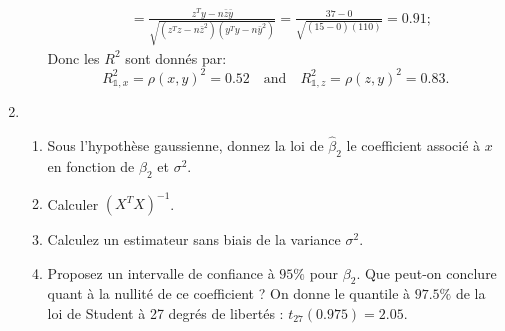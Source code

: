 \documentclass{../headers/td_upc}
\providecommand{\1}{\mathds{1}}
\begin{document}
\begin{enumerate}
\begin{enumerate}
{\begin{align*}
        & = \frac{z^Ty - n\bar{z}\bar{y}}{\sqrt{(z^Tz - n\bar{z}^2)(y^Ty - n\bar{y}^2)}}
        = \frac{37 - 0}{\sqrt{(15 - 0)(110)}} 
        = 0.91 ;
    \end{align*}
    Donc les $R^2$ sont donnés par:
    \[
    R^2_{\1,x} = \rho(x, y)^2 = 0.52
    \quad \text{and}\quad
    R^2_{\1,z} = \rho(z, y)^2 = 0.83.
    \]
			}
		\end{enumerate}
				\item 
			\begin{enumerate}
			\item Sous l'hypothèse gaussienne, donnez la loi de $\hat{\beta}_2$ le coefficient associé à $x$
			en fonction de $\beta_2$ et $\sigma^2$.
			\item Calculer $(X^T X)^{-1}$.
			\item Calculez un estimateur sans biais de la variance $\sigma^2$.
			\cor{
			\[
			\hat{\sigma}^2 = \frac{\|\hat{\varepsilon}\|^{2}}{n-3} = \frac{12}{30-3} = 0.44.
			\]
			}
			\item Proposez un intervalle de confiance à $95\%$ pour $\beta_2$.
			Que peut-on conclure quant à la nullité de ce coefficient ?
			On donne le quantile à $97.5\%$ de la loi de Student à 27 degrés de libertés :
			$t_{27}(0.975) = 2.05$.
			\end{enumerate}
	\end{enumerate}
\end{document}
